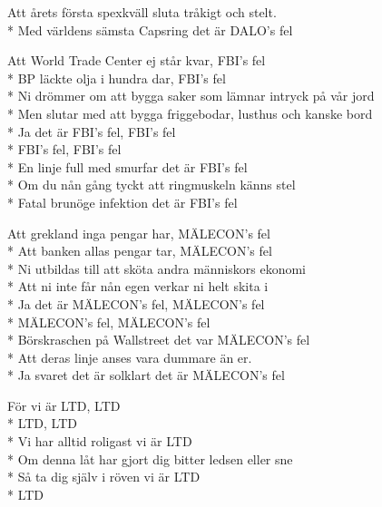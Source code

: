 \begin{SongText}
\begin{Verse}
    Att årets första spexkväll sluta tråkigt och stelt.\\*%
    Med världens sämsta Capsring det är DALO's fel
\end{Verse}
\begin{Verse}
    Att World Trade Center ej står kvar, FBI's fel\\*%
    BP läckte olja i hundra dar, FBI's fel\\*%
    Ni drömmer om att bygga saker som lämnar intryck på vår jord\\*%
    Men slutar med att bygga friggebodar, lusthus och kanske bord\\*%
    Ja det är FBI's fel, FBI's fel\\*%
    FBI's fel, FBI's fel\\*%
    En linje full med smurfar det är FBI's fel\\*%
    Om du nån gång tyckt att ringmuskeln känns stel\\*%
    Fatal brunöge infektion det är FBI's fel
\end{Verse}
\begin{Verse}
    Att grekland inga pengar har, MÄLECON's fel\\*%
    Att banken allas pengar tar, MÄLECON's fel\\*%
    Ni utbildas till att sköta andra människors ekonomi\\*%
    Att ni inte får nån egen verkar ni helt skita i\\*%
    Ja det är MÄLECON's fel, MÄLECON's fel\\*%
    MÄLECON's fel, MÄLECON's fel\\*%
    Börskraschen på Wallstreet det var MÄLECON's fel\\*%
    Att deras linje anses vara dummare än er.\\*%
    Ja svaret det är solklart det är MÄLECON's fel
\end{Verse}
\begin{Verse}
    För vi är LTD, LTD\\*%
    LTD, LTD\\*%
    Vi har alltid roligast vi är LTD\\*%
    Om denna låt har gjort dig bitter ledsen eller sne\\*%
    Så ta dig själv i röven vi är LTD\\*%
    LTD
\end{Verse}
\end{SongText}

